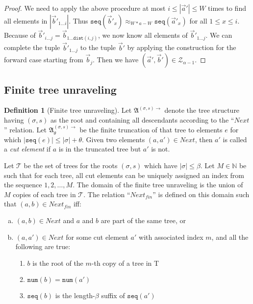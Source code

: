 \documentclass[draft]{scrartcl}
\theoremstyle{definition}
\newtheorem{definition}[theorem]{Definition}
\newcommand{\seq}[1]{\mathtt{seq}({#1})}
\newcommand{\num}[1]{\mathtt{num}({#1})}
\newcommand{\dist}[2]{\mathtt{dist}({#1},{#2})}
\newcommand{\sij}{_{i\ldots{}j}}
\begin{document}
\begin{proof}
  We need to apply the above procedure at most $i \le |\overrightarrow{a}'| \le W$ times to find all elements in $|\overrightarrow{b}'_{1\ldots{}i}|$.
  Thus $\seq{\overrightarrow{b}'_{x}} \approx_{W*a - W} \seq{\overrightarrow{a}'_{x}}$ for all $1 \le x \le i$.
  Because of $\overrightarrow{b}'\sij = \overrightarrow{b}_{1\ldots{}\dist{i}{j}}$, we now know all elements of $\overrightarrow{b}'_{1\ldots{}j}$.
  We can complete the tuple $\overrightarrow{b}'_{1\ldots{}j}$ to the tuple $\overrightarrow{b}'$ by applying the construction for the forward case starting from $\overrightarrow{b}_{j}$.
  Then we have $(\overrightarrow{a}', \overrightarrow{b}') \in \mathcal{Z}_{\alpha-1}$.
\end{proof}

\subsection{Finite tree unraveling}

\begin{definition}[Finite tree unraveling]
  Let $\mathfrak{A}^{(\sigma, s) \rightarrow}$ denote the tree structure having $(\sigma, s)$ as the root and containing all descendants according to the ``$\mathit{Next}$'' relation.
  Let $\mathfrak{A}^{(\sigma, s) \rightarrow}_{\theta}$ be the finite truncation of that tree to elements $e$ for which $|\seq{e}| \le |\sigma| + \theta$.
  Given two elements $(a, a') \in \mathit{Next}$, then $a'$ is called a \emph{cut element} if $a$ is in the truncated tree but $a'$ is not.

  Let $\mathcal{T}$ be the set of trees for the roots $(\sigma, s)$ which have $|\sigma| \le \beta$.
  Let $M \in \mathbb{N}$ be such that for each tree, all cut elements can be uniquely assigned an index from the sequence $1, 2, \ldots, M$.
  The domain of the finite tree unraveling is the union of $M$ copies of each tree in $\mathcal{T}$.
  The relation ``$\mathit{Next}_{fin}$'' is defined on this domain such that $(a, b) \in \mathit{Next}_{fin}$ iff:
  \begin{enumerate}[(a)]
    \item $(a, b) \in \mathit{Next}$ and $a$ and $b$ are part of the same tree, or
    \item $(a, a') \in \mathit{Next}$ for some cut element $a'$ with associated index $m$, and all the following are true:
        \begin{enumerate}
          \item $b$ is the root of the $m$-th copy of a tree in T
          \item $\num{b} = \num{a'}$
          \item $\seq{b}$ is the length-$\beta$ suffix of $\seq{a'}$
        \end{enumerate}
  \end{enumerate}
\end{definition}
\end{document}
